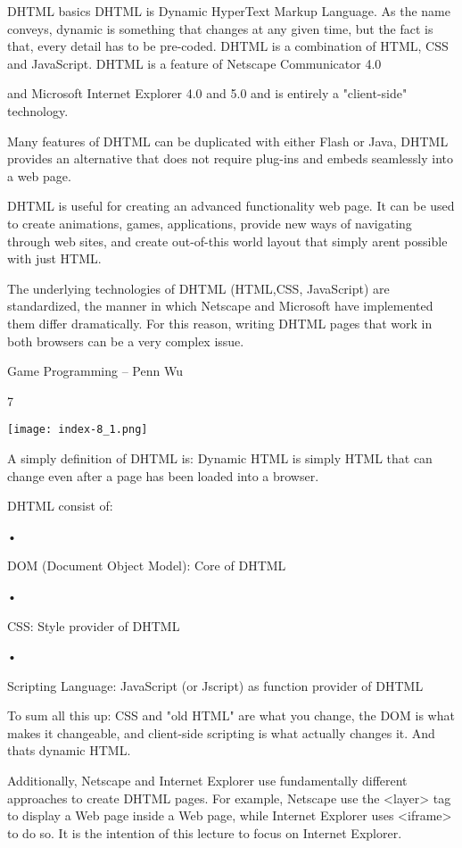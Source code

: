 \documentclass[
]{article}
\begin{document}
DHTML basics DHTML is Dynamic HyperText Markup Language. As the name
conveys, \textquotesingle dynamic\textquotesingle{} is something that
changes at any given time, but the fact is that, every detail has to be
pre-coded. DHTML is a combination of HTML, CSS and JavaScript. DHTML is
a feature of Netscape Communicator 4.0

and Microsoft Internet Explorer 4.0 and 5.0 and is entirely a
"client-side" technology.

Many features of DHTML can be duplicated with either Flash or Java,
DHTML provides an alternative that does not require plug-ins and embeds
seamlessly into a web page.

DHTML is useful for creating an advanced functionality web page. It can
be used to create animations, games, applications, provide new ways of
navigating through web sites, and create out-of-this world layout that
simply aren\textquotesingle t possible with just HTML.

The underlying technologies of DHTML (HTML,CSS, JavaScript) are
standardized, the manner in which Netscape and Microsoft have
implemented them differ dramatically. For this reason, writing DHTML
pages that work in both browsers can be a very complex issue.

Game Programming -- Penn Wu

7

\protect\hypertarget{index_split_001.htmlux5cux23p8}{}{}\texttt{[image: index-8\_1.png]}

A simply definition of DHTML is: Dynamic HTML is simply HTML that can
change even after a page has been loaded into a browser.

DHTML consist of:

•

DOM (Document Object Model): Core of DHTML

•

CSS: Style provider of DHTML

•

Scripting Language: JavaScript (or Jscript) as function provider of
DHTML

To sum all this up: CSS and "old HTML" are what you change, the DOM is
what makes it changeable, and client-side scripting is what actually
changes it. And that\textquotesingle s dynamic HTML.

Additionally, Netscape and Internet Explorer use fundamentally different
approaches to create DHTML pages. For example, Netscape use the
\textless layer\textgreater{} tag to display a Web page inside a Web
page, while Internet Explorer uses \textless iframe\textgreater{} to do
so. It is the intention of this lecture to focus on Internet Explorer.
\end{document}
